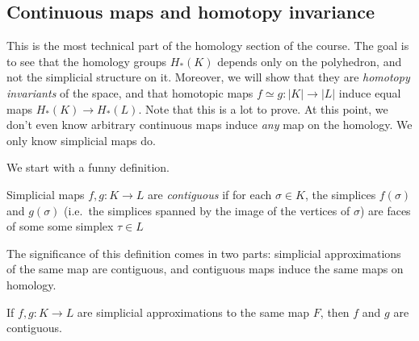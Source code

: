 \documentclass[a4paper]{article}
\begin{document}
\subsection{Continuous maps and homotopy invariance}
This is the most technical part of the homology section of the course. The goal is to see that the homology groups $H_*(K)$ depends only on the polyhedron, and not the simplicial structure on it. Moreover, we will show that they are \emph{homotopy invariants} of the space, and that homotopic maps $f \simeq g: |K| \to |L|$ induce equal maps $H_*(K) \to H_*(L)$. Note that this is a lot to prove. At this point, we don't even know arbitrary continuous maps induce \emph{any} map on the homology. We only know simplicial maps do.

We start with a funny definition.
\begin{defi}
  Simplicial maps $f, g: K \to L$ are \emph{contiguous} if for each $\sigma \in K$, the simplices $f(\sigma)$ and $g(\sigma)$ (i.e.\ the simplices spanned by the image of the vertices of $\sigma$) are faces of some some simplex $\tau \in L$
  \begin{center}
  \end{center}
\end{defi}

The significance of this definition comes in two parts: simplicial approximations of the same map are contiguous, and contiguous maps induce the same maps on homology.

\begin{lemma}
  If $f, g: K \to L$ are simplicial approximations to the same map $F$, then $f$ and $g$ are contiguous.
\end{lemma}
\end{document}
